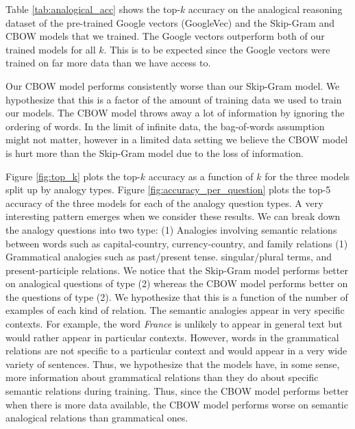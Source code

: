 Table \ref{tab:analogical_acc} shows the top-$k$ accuracy on the analogical reasoning dataset of the pre-trained Google vectors (GoogleVec) and the Skip-Gram and CBOW models that we trained. The Google vectors outperform both of our trained models for all $k$. This is to be expected since the Google vectors were trained on far more data than we have access to. 

Our CBOW model performs consistently worse than our Skip-Gram model. We hypothesize that this is a factor of the amount of training data we used to train our models. The CBOW model throws away a lot of information by ignoring the ordering of words. In the limit of infinite data, the bag-of-words assumption might not matter, however in a limited data setting we believe the CBOW model is hurt more than the Skip-Gram model due to the loss of information. 

Figure \ref{fig:top_k} plots the top-$k$ accuracy as a function of $k$ for the three models split up by analogy types. Figure \ref{fig:accuracy_per_question}  plots the top-5 accuracy of the three models for each of the analogy question types. A very interesting pattern emerges when we consider these results. We can break down the analogy questions into two type: (1) Analogies involving semantic relations between words such as capital-country, currency-country, and family relations (1) Grammatical analogies such as past/present tense. singular/plural terms, and present-participle relations. We notice that the Skip-Gram model performs better on analogical questions of type (2) whereas the CBOW model performs better on the questions of type (2). We hypothesize that this is a function of the number of examples of each kind of relation. The semantic analogies appear in very specific contexts. For example, the word {\it France} is unlikely to appear in general text but would rather appear in particular contexts. However, words in the grammatical relations are not specific to a particular context and would appear in a very wide variety of sentences. Thus, we hypothesize that the models have, in some sense, more information about grammatical relations than they do about specific semantic relations during training. Thus, since the CBOW model performs better when there is more data available, the CBOW model performs worse on semantic analogical relations than grammatical ones. 


